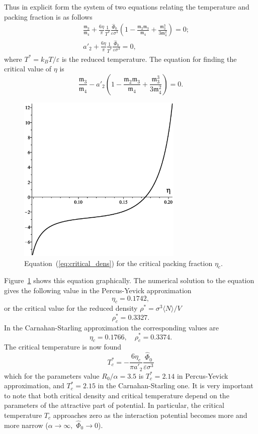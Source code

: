 Thus in explicit form the system of two equations relating the temperature and packing fraction is as follows
\begin{eqnarray}
	&&\frac{\mathfrak{m}_3}{\mathfrak{m}_4} + \frac{6\eta}{\pi} \frac{1}{T^*} \frac{\hat{\Phi}_0}{\varepsilon\sigma^3}
	\left(1 - \frac{\mathfrak{m}_2\mathfrak{m}_3}{\mathfrak{m}_4} + \frac{\mathfrak{m}_3^3}{3\mathfrak{m}_4^2} \right) = 0;
	\nonumber\\
	&& a'_2 + \frac{6\eta}{\pi} \frac{1}{T^*} \frac{\hat{\Phi}_0}{\varepsilon\sigma^3} = 0,
\end{eqnarray}
where $T^* = k_BT/\varepsilon$ is the reduced temperature.
The equation for finding the critical value of $\eta$ is 
\begin{equation}
	\label{eq:critical_dens}
	\frac{\mathfrak{m}_3}{\mathfrak{m}_4} - a'_2
	\left(1 - \frac{\mathfrak{m}_2\mathfrak{m}_3}{\mathfrak{m}_4} + \frac{\mathfrak{m}_3^3}{3\mathfrak{m}_4^2} \right) = 0.
\end{equation}
\begin{figure}[htbp]
	\includegraphics[width=0.7\textwidth,angle=0]{equation_for_critical_density}
	\caption{Equation~(\ref{eq:critical_dens}) for the critical packing fraction $\eta_c$.}
	\label{eq_for_eta_c}
\end{figure}
Figure~\ref{eq_for_eta_c} shows this equation graphically. The numerical solution to the equation gives the following value in the Percus-Yevick approximation
$$
\eta_c = 0.1742,
$$
or the critical value for the reduced density $\rho^* = \sigma^3\langle N \rangle / V$
$$
\rho^*_c = 0.3327.
$$
In the Carnahan-Starling approximation the corresponding values are
\begin{equation}
	\eta_c = 0.1766, \quad \rho^*_c = 0.3374.
\end{equation}
The critical temperature is now found
$$
T^*_c = -\frac{6\eta_c}{\pi a'_2} \frac{\hat{\Phi}_0}{\varepsilon\sigma^3}
$$
which for the parameters value $R_0/\alpha = 3.5$ is $T^*_c=2.14$ in Percus-Yevick approximation, and $T^*_c=2.15$ in the Carnahan-Starling one.
It is very important to note that both critical density and critical temperature depend on the parameters of the attractive part of potential. In particular, the critical temperature $T_c$ approaches zero as the interaction potential becomes more and more narrow ($\alpha \to \infty,$ $\hat{\Phi}_0 \to 0$).

